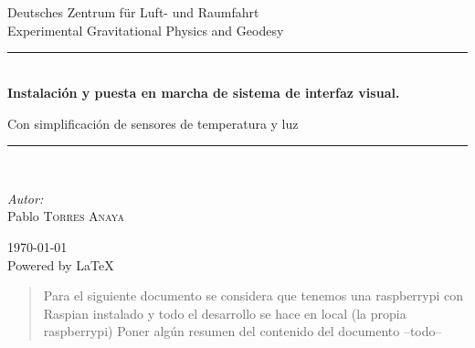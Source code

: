 \documentclass[12pt, a4paper, oneside, titlepage]{article}
\newcommand{\HRule}{\rule{\linewidth}{0.5mm}}
\begin{document}
	
	\begin{titlepage}
		\begin{center}
			\textsc{\LARGE }\\[1.5cm]
			\textsc{\Large }\\[0.5cm]
			Deutsches Zentrum für Luft- und Raumfahrt\\
			Experimental Gravitational Physics and Geodesy \\
			\HRule \\[0.8cm]
			{ \huge \bfseries Instalación y puesta en marcha de sistema de interfaz visual.}\\[0.4cm]
			
\begin{Large}
						Con simplificación de sensores de temperatura y luz

			\end{Large}			\HRule \\[1.5cm]
			
			\begin{minipage}{0.4\textwidth}
				\begin{flushleft} \large
					\emph{Autor:}\\
					Pablo \textsc{Torres Anaya}
				\end{flushleft}
			\end{minipage}
			\begin{minipage}{0.4\textwidth}
				\begin{flushright} \large
				\end{flushright}
			\end{minipage}
			\vfill
			{\large \today}\\
			{\normalsize Powered by \LaTeX}
			
		\end{center}
	\end{titlepage}
	\tableofcontents
\begin{abstract}
Para el siguiente documento se considera que tenemos una raspberrypi con Raspian instalado y todo el desarrollo se hace en local (la propia raspberrypi)
Poner algún resumen del contenido del documento
--todo--
\end{abstract}
\end{document}
